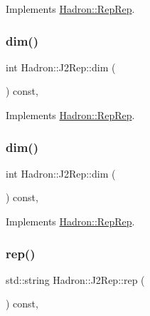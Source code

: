 Implements \mbox{\hyperlink{structHadron_1_1RepRep_a92c8802e5ed7afd7da43ccfd5b7cd92b}{Hadron\+::\+Rep\+Rep}}.

\mbox{\label{structHadron_1_1J2Rep_a9bbfe6d82db1e96beda068411ff79371}} 
\subsubsection{\texorpdfstring{dim()}{dim()}\hspace{0.1cm}{\footnotesize\ttfamily [4/5]}}
{\footnotesize\ttfamily int Hadron\+::\+J2\+Rep\+::dim (\begin{DoxyParamCaption}{ }\end{DoxyParamCaption}) const\hspace{0.3cm}{\ttfamily [inline]}, {\ttfamily [virtual]}}



Implements \mbox{\hyperlink{structHadron_1_1RepRep_a92c8802e5ed7afd7da43ccfd5b7cd92b}{Hadron\+::\+Rep\+Rep}}.

\mbox{\label{structHadron_1_1J2Rep_a9bbfe6d82db1e96beda068411ff79371}} 
\subsubsection{\texorpdfstring{dim()}{dim()}\hspace{0.1cm}{\footnotesize\ttfamily [5/5]}}
{\footnotesize\ttfamily int Hadron\+::\+J2\+Rep\+::dim (\begin{DoxyParamCaption}{ }\end{DoxyParamCaption}) const\hspace{0.3cm}{\ttfamily [inline]}, {\ttfamily [virtual]}}



Implements \mbox{\hyperlink{structHadron_1_1RepRep_a92c8802e5ed7afd7da43ccfd5b7cd92b}{Hadron\+::\+Rep\+Rep}}.

\mbox{\label{structHadron_1_1J2Rep_ae377be8f84efb218c8a07db0d4d5bb01}} 
\subsubsection{\texorpdfstring{rep()}{rep()}\hspace{0.1cm}{\footnotesize\ttfamily [1/5]}}
{\footnotesize\ttfamily std\+::string Hadron\+::\+J2\+Rep\+::rep (\begin{DoxyParamCaption}{ }\end{DoxyParamCaption}) const\hspace{0.3cm}{\ttfamily [inline]}, {\ttfamily [virtual]}}



